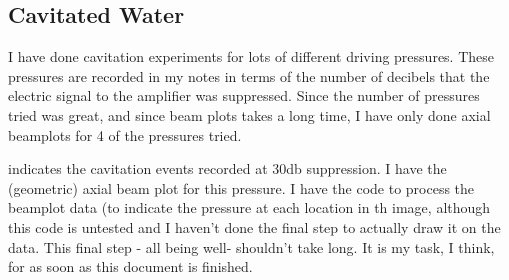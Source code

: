 




\subsection{Cavitated Water}\label{sec:water_vapourisation}

I have done cavitation experiments for lots of different driving pressures.
These pressures are recorded in my notes in terms of the number of decibels that the electric signal to the amplifier was suppressed.
Since the number of pressures tried was great, and since beam plots takes a long time,
I have only done axial  beamplots for 4 of the pressures tried.

 indicates the cavitation events recorded at 30db suppression.
I have the (geometric) axial beam plot for this pressure.
I have the code to process the beamplot data (to indicate the pressure at each location in th image, 
although this code is untested and I haven't done the final step to actually draw it on the data.
This final step - all being well- shouldn't take long. 
It is my task, I think, for as soon as this document is finished.

